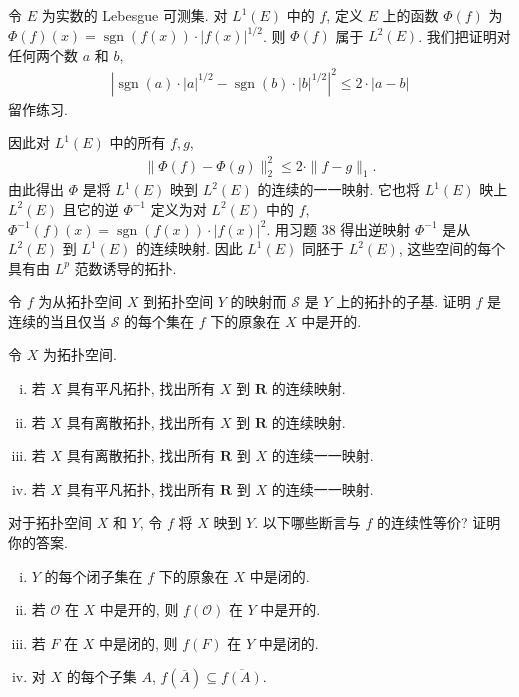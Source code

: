 \documentclass[../../main.tex]{subfiles}
\begin{document}
\begin{example}[Mazur]\label{example:ch11-mazur}
令 $E$ 为实数的 Lebesgue 可测集. 对 $L^{1}(E)$ 中的 $f$, 定义 $E$ 上的函数 $\Phi(f)$ 为 $\Phi(f)(x)=\operatorname{sgn}(f(x))\cdot|f(x)|^{1/2}$. 则 $\Phi(f)$ 属于 $L^{2}(E)$. 我们把证明对任何两个数 $a$ 和 $b$,
\begin{align*}
\left|\operatorname{sgn}(a)\cdot|a|^{1/2}-\operatorname{sgn}(b)\cdot|b|^{1/2}\right|^{2}\leqslant 2\cdot|a-b|
\end{align*}
留作练习.

因此对 $L^{1}(E)$ 中的所有 $f,g$,
\begin{align*}
\|\Phi(f)-\Phi(g)\|_{2}^{2}\leqslant 2\cdot\|f-g\|_{1}.
\end{align*}
由此得出 $\Phi$ 是将 $L^{1}(E)$ 映到 $L^{2}(E)$ 的连续的一一映射. 它也将 $L^{1}(E)$ 映上 $L^{2}(E)$ 且它的逆 $\Phi^{-1}$ 定义为对 $L^{2}(E)$ 中的 $f$, $\Phi^{-1}(f)(x)=\operatorname{sgn}(f(x))\cdot|f(x)|^{2}$. 用习题 38 得出逆映射 $\Phi^{-1}$ 是从 $L^{2}(E)$ 到 $L^{1}(E)$ 的连续映射. 因此 $L^{1}(E)$ 同胚于 $L^{2}(E)$, 这些空间的每个具有由 $L^{p}$ 范数诱导的拓扑.
\end{example}

\begin{exercise}\label{exercise:ch11-23}
令 $f$ 为从拓扑空间 $X$ 到拓扑空间 $Y$ 的映射而 $\mathcal{S}$ 是 $Y$ 上的拓扑的子基. 证明 $f$ 是连续的当且仅当 $\mathcal{S}$ 的每个集在 $f$ 下的原象在 $X$ 中是开的.
\end{exercise}

\begin{exercise}\label{exercise:ch11-24}
令 $X$ 为拓扑空间.
\begin{enumerate}[(i)]
\item 若 $X$ 具有平凡拓扑, 找出所有 $X$ 到 $\mathbf{R}$ 的连续映射.
\item 若 $X$ 具有离散拓扑, 找出所有 $X$ 到 $\mathbf{R}$ 的连续映射.
\item 若 $X$ 具有离散拓扑, 找出所有 $\mathbf{R}$ 到 $X$ 的连续一一映射.
\item 若 $X$ 具有平凡拓扑, 找出所有 $\mathbf{R}$ 到 $X$ 的连续一一映射.
\end{enumerate}
\end{exercise}

\begin{exercise}\label{exercise:ch11-25}
对于拓扑空间 $X$ 和 $Y$, 令 $f$ 将 $X$ 映到 $Y$. 以下哪些断言与 $f$ 的连续性等价? 证明你的答案.
\begin{enumerate}[(i)]
\item $Y$ 的每个闭子集在 $f$ 下的原象在 $X$ 中是闭的.
\item 若 $\mathcal{O}$ 在 $X$ 中是开的, 则 $f(\mathcal{O})$ 在 $Y$ 中是开的.
\item 若 $F$ 在 $X$ 中是闭的, 则 $f(F)$ 在 $Y$ 中是闭的.
\item 对 $X$ 的每个子集 $A$, $f(\overline{A})\subseteq\overline{f(A)}$.
\end{enumerate}
\end{exercise}
\end{document}
